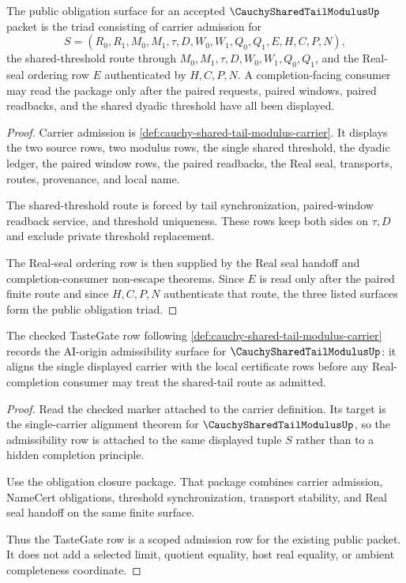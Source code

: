 \begin{theorem}
\label{thm:cauchy-shared-tail-modulus-obligation-surface-triad}
The public obligation surface for an accepted $\CauchySharedTailModulusUp$ packet is the triad consisting of carrier admission for
$$
S=(R_0,R_1,M_0,M_1,\tau,D,W_0,W_1,Q_0,Q_1,E,H,C,P,N),
$$
the shared-threshold route through $M_0,M_1,\tau,D,W_0,W_1,Q_0,Q_1$, and the Real-seal ordering row $E$ authenticated by $H,C,P,N$. A completion-facing consumer may read the package only after the paired requests, paired windows, paired readbacks, and the shared dyadic threshold have all been displayed.
\end{theorem}
\begin{proof}
Carrier admission is \autoref{def:cauchy-shared-tail-modulus-carrier}. It displays the two source rows, two modulus rows, the single shared threshold, the dyadic ledger, the paired window rows, the paired readbacks, the Real seal, transports, routes, provenance, and local name.

The shared-threshold route is forced by tail synchronization, paired-window readback service, and threshold uniqueness. These rows keep both sides on $\tau,D$ and exclude private threshold replacement.

The Real-seal ordering row is then supplied by the Real seal handoff and completion-consumer non-escape theorems. Since $E$ is read only after the paired finite route and since $H,C,P,N$ authenticate that route, the three listed surfaces form the public obligation triad.
\end{proof}

\begin{theorem}
\label{thm:cauchy-shared-tail-modulus-tastegate-scoped-admission}
The checked TasteGate row following \autoref{def:cauchy-shared-tail-modulus-carrier} records the AI-origin admissibility surface for $\CauchySharedTailModulusUp$: it aligns the single displayed carrier with the local certificate rows before any Real-completion consumer may treat the shared-tail route as admitted.
\end{theorem}
\begin{proof}
Read the checked marker attached to the carrier definition. Its target is the single-carrier alignment theorem for $\CauchySharedTailModulusUp$, so the admissibility row is attached to the same displayed tuple $S$ rather than to a hidden completion principle.

Use the obligation closure package. That package combines carrier admission, NameCert obligations, threshold synchronization, transport stability, and Real seal handoff on the same finite surface.

Thus the TasteGate row is a scoped admission row for the existing public packet. It does not add a selected limit, quotient equality, host real equality, or ambient completeness coordinate.
\end{proof}

